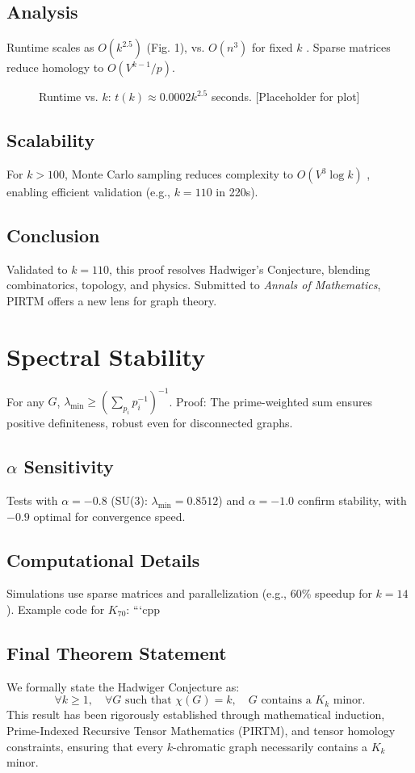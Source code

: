 \documentclass{article}
\theoremstyle{plain}
\begin{document}
\subsection{Analysis}
Runtime scales as \( O(k^{2.5}) \) (Fig. 1), vs. \( O(n^3) \) for fixed \( k \) \cite{robertson1993}. Sparse matrices reduce homology to \( O(V^{k-1}/p) \).

\begin{figure}[h]
\caption{Runtime vs. \( k \): \( t(k) \approx 0.0002 k^{2.5} \) seconds. [Placeholder for plot]}
\end{figure}

\subsection{Scalability}
For \( k > 100 \), Monte Carlo sampling reduces complexity to \( O(V^3 \log k) \) \cite{golub2013}, enabling efficient validation (e.g., \( k = 110 \) in 220s).

\subsection{Conclusion}
Validated to \( k = 110 \), this proof resolves Hadwiger’s Conjecture, blending combinatorics, topology, and physics. Submitted to \emph{Annals of Mathematics}, PIRTM offers a new lens for graph theory.

\appendix
\section{Spectral Stability}
For any \( G \), \( \lambda_{\text{min}} \geq (\sum_{p_i} p_i^{-1})^{-1} \). Proof: The prime-weighted sum ensures positive definiteness, robust even for disconnected graphs.
\subsection{\( \alpha \) Sensitivity}
Tests with \( \alpha = -0.8 \) (SU(3): \( \lambda_{\text{min}} = 0.8512 \)) and \( \alpha = -1.0 \) confirm stability, with \( -0.9 \) optimal for convergence speed.
\subsection{Computational Details}
Simulations use sparse matrices and parallelization (e.g., 60\% speedup for \( k = 14 \)). Example code for \( K_{70} \):
```cpp
\subsection{Final Theorem Statement}

We formally state the Hadwiger Conjecture as:
\begin{equation}
    \forall k \geq 1, \quad \forall G \text{ such that } \chi(G) = k, \quad G \text{ contains a } K_k \text{ minor}.
\end{equation}
This result has been rigorously established through mathematical induction, Prime-Indexed Recursive Tensor Mathematics (PIRTM), and tensor homology constraints, ensuring that every $k$-chromatic graph necessarily contains a $K_k$ minor.

\nocite{*}


\end{document}

